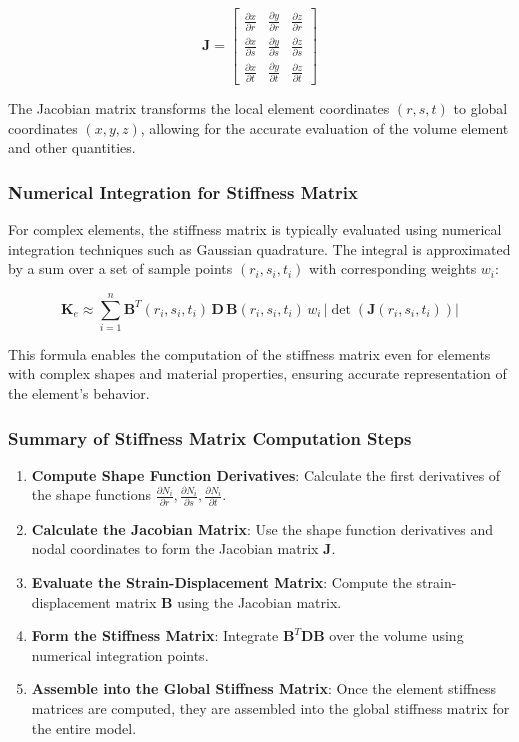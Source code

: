 \[
\mathbf{J} =
\begin{bmatrix}
\frac{\partial x}{\partial r} & \frac{\partial y}{\partial r} & \frac{\partial z}{\partial r} \\
\frac{\partial x}{\partial s} & \frac{\partial y}{\partial s} & \frac{\partial z}{\partial s} \\
\frac{\partial x}{\partial t} & \frac{\partial y}{\partial t} & \frac{\partial z}{\partial t}
\end{bmatrix}
\]

The Jacobian matrix transforms the local element coordinates \((r, s, t)\) to global coordinates \((x, y, z)\), allowing for the accurate evaluation of the volume element and other quantities.

\subsubsection{Numerical Integration for Stiffness Matrix}

For complex elements, the stiffness matrix is typically evaluated using numerical integration techniques such as Gaussian quadrature. The integral is approximated by a sum over a set of sample points \((r_i, s_i, t_i)\) with corresponding weights \( w_i \):

\[
\mathbf{K}_e \approx \sum_{i=1}^{n} \mathbf{B}^T(r_i, s_i, t_i) \, \mathbf{D} \, \mathbf{B}(r_i, s_i, t_i) \, w_i \, \left| \det(\mathbf{J}(r_i, s_i, t_i)) \right|
\]

This formula enables the computation of the stiffness matrix even for elements with complex shapes and material properties, ensuring accurate representation of the element's behavior.

\subsubsection{Summary of Stiffness Matrix Computation Steps}

\begin{enumerate}
    \item \textbf{Compute Shape Function Derivatives}: Calculate the first derivatives of the shape functions \( \frac{\partial N_i}{\partial r}, \frac{\partial N_i}{\partial s}, \frac{\partial N_i}{\partial t} \).
    \item \textbf{Calculate the Jacobian Matrix}: Use the shape function derivatives and nodal coordinates to form the Jacobian matrix \( \mathbf{J} \).
    \item \textbf{Evaluate the Strain-Displacement Matrix}: Compute the strain-displacement matrix \( \mathbf{B} \) using the Jacobian matrix.
    \item \textbf{Form the Stiffness Matrix}: Integrate \( \mathbf{B}^T \mathbf{D} \mathbf{B} \) over the volume using numerical integration points.
    \item \textbf{Assemble into the Global Stiffness Matrix}: Once the element stiffness matrices are computed, they are assembled into the global stiffness matrix for the entire model.
\end{enumerate}

